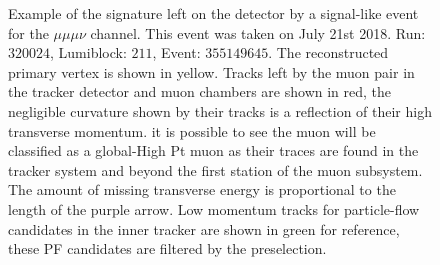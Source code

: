 
\begin{figure}
  \centering
  \vfil
  \caption{Example of the signature left on the detector by a signal-like event
    for the $\mu\mu\mu\nu$ channel. This event was taken on July 21st 2018.
    Run: $320024$, Lumiblock: $211$, Event: $355149645$. The reconstructed primary vertex is shown in yellow.
    Tracks left by the muon pair in the tracker detector and muon chambers are shown in red,
    the negligible curvature shown by their tracks is a reflection of their high transverse momentum.
    it is possible to see the muon will be classified as a global-High Pt muon as their traces
    are found in the tracker system and beyond the first station of the muon subsystem.
    The amount of missing
    transverse energy is proportional to the length of the purple arrow. Low momentum
    tracks for particle-flow candidates in the inner tracker are shown in green for
    reference, these PF candidates are filtered by the preselection. }
  \label{fig:Fireworks_mumumuv}
\end{figure}






